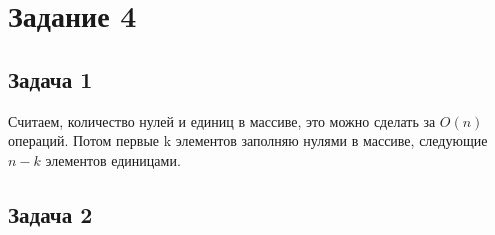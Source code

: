 \documentclass[a4paper,14pt]{article} %
\begin{document}

\section{Задание 4}

\subsection{Задача 1}
Считаем, количество нулей и единиц в массиве, это можно сделать за $O(n)$ операций. Потом первые k элементов заполняю нулями в массиве, следующие $n-k$ элементов единицами.


\subsection{Задача 2}
\end{document}
